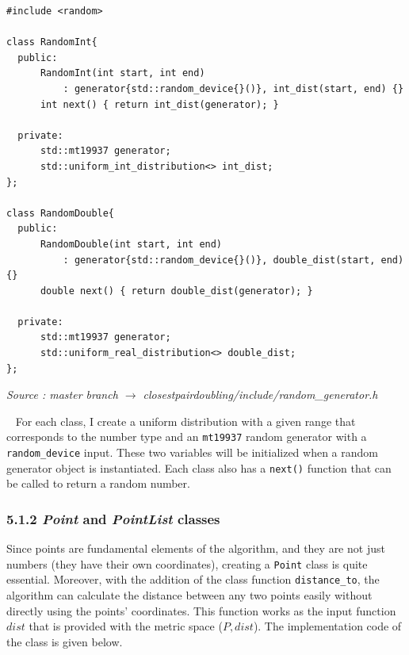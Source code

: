 \documentclass[12pt,english,]{article}
\newcommand{\code}[1]{\colorbox{light-gray}{\texttt{#1}}}
\begin{document}
\begin{lstlisting}
#include <random>

class RandomInt{
  public:
      RandomInt(int start, int end) 
          : generator{std::random_device{}()}, int_dist(start, end) {}
      int next() { return int_dist(generator); } 

  private:
      std::mt19937 generator;
      std::uniform_int_distribution<> int_dist;
};

class RandomDouble{
  public:
      RandomDouble(int start, int end) 
          : generator{std::random_device{}()}, double_dist(start, end) {}
      double next() { return double_dist(generator); } 

  private:
      std::mt19937 generator;
      std::uniform_real_distribution<> double_dist;
};
\end{lstlisting}
\vspace{-9truemm}
\begin{minipage}{1\textwidth}
  \begin{flushright}
  {\footnotesize \emph{Source \footnotemark: master branch $\rightarrow$ closestpairdoubling/include/random\_generator.h }\par}
  \end{flushright}
\end{minipage}
\vspace{0.5truemm}

~ For each class, I create a uniform distribution with a given range
that corresponds to the number type and an \code{mt19937} random
generator with a \code{random\_device} input. These two variables will
be initialized when a random generator object is instantiated. Each
class also has a \code{next()} function that can be called to return a
random number.

\hypertarget{section5.1.2}{%
\subsubsection{\texorpdfstring{5.1.2 \emph{Point} and \emph{PointList}
classes}{5.1.2  and  classes}}\label{section5.1.2}}

Since points are fundamental elements of the algorithm, and they are not
just numbers (they have their own coordinates), creating a \code{Point}
class is quite essential. Moreover, with the addition of the class
function \code{distance\_to}, the algorithm can calculate the distance
between any two points easily without directly using the points'
coordinates. This function works as the input function \(dist\) that is
provided with the metric space (\(P, dist\)). The implementation code of
the class is given below.
\end{document}

